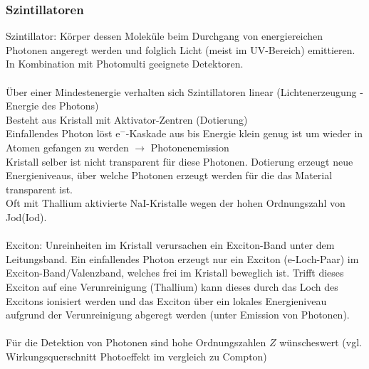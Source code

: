 \documentclass[11pt, a4paper]{article}
\numberwithin{equation}{section}
\begin{document}
\subsubsection{Szintillatoren}
Szintillator: Körper dessen Moleküle beim Durchgang von energiereichen Photonen angeregt werden und folglich Licht (meist im UV-Bereich) emittieren. In Kombination mit Photomulti geeignete Detektoren.\\
\\
Über einer Mindestenergie verhalten sich Szintillatoren linear (Lichtenerzeugung - Energie des Photons)
\\
Besteht aus Kristall mit Aktivator-Zentren (Dotierung)\\
Einfallendes Photon löst $\mathrm{e}^{-}$-Kaskade aus bis Energie klein genug ist um wieder in Atomen gefangen zu werden $\rightarrow$ Photonenemission\\
Kristall selber ist nicht transparent für diese Photonen. Dotierung erzeugt neue Energieniveaus, über welche Photonen erzeugt werden für die das Material transparent ist.\\
Oft mit Thallium aktivierte NaI-Kristalle wegen der hohen Ordnungszahl von Jod(Iod).\\
\\
Exciton: Unreinheiten im Kristall verursachen ein Exciton-Band unter dem Leitungsband. Ein einfallendes Photon erzeugt nur ein Exciton (e-Loch-Paar) im Exciton-Band/Valenzband, welches frei im Kristall beweglich ist. Trifft dieses Exciton auf eine Verunreinigung (Thallium) kann dieses durch das Loch des Excitons ionisiert werden und das Exciton über ein lokales Energieniveau aufgrund der Verunreinigung abgeregt werden (unter Emission von Photonen).\\
\\
Für die Detektion von Photonen sind hohe Ordnungszahlen $Z$ wünscheswert (vgl. Wirkungsquerschnitt Photoeffekt im vergleich zu Compton)
\end{document}
